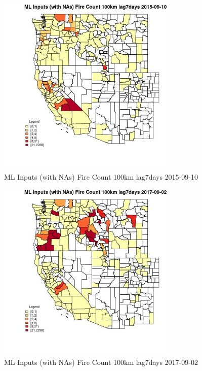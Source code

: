 \begin{figure} 
\centering  
\includegraphics[width=0.77\textwidth]{Code_Outputs/Report_ML_input_PM25_Step4_part_e_de_duplicated_aves_compiled_2019-05-21wNAs_CountyFire_Count_100km_lag7daysMean2015-09-10.jpg} 
\caption{\label{fig:Report_ML_input_PM25_Step4_part_e_de_duplicated_aves_compiled_2019-05-21wNAsCountyFire_Count_100km_lag7daysMean2015-09-10}ML Inputs (with NAs) Fire Count 100km lag7days 2015-09-10} 
\end{figure} 
 

\begin{figure} 
\centering  
\includegraphics[width=0.77\textwidth]{Code_Outputs/Report_ML_input_PM25_Step4_part_e_de_duplicated_aves_compiled_2019-05-21wNAs_CountyFire_Count_100km_lag7daysMean2017-09-02.jpg} 
\caption{\label{fig:Report_ML_input_PM25_Step4_part_e_de_duplicated_aves_compiled_2019-05-21wNAsCountyFire_Count_100km_lag7daysMean2017-09-02}ML Inputs (with NAs) Fire Count 100km lag7days 2017-09-02} 
\end{figure} 
 

